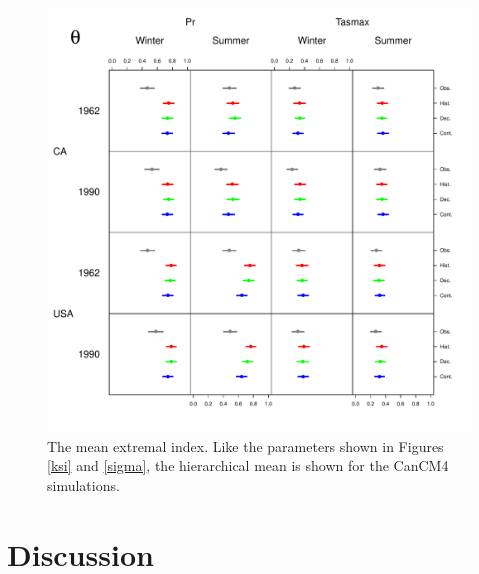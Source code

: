 \documentclass[12pt]{article}
\begin{document}
\begin{figure}
\begin{center}
\includegraphics[scale=0.72]{figs/theta.pdf}
\end{center}
\caption{The mean extremal index. Like the parameters shown in Figures \ref{ksi} and \ref{sigma}, the hierarchical mean is shown for the CanCM4 simulations.}
\end{figure}

\section{Discussion}
\label{discussion}
\end{document}
